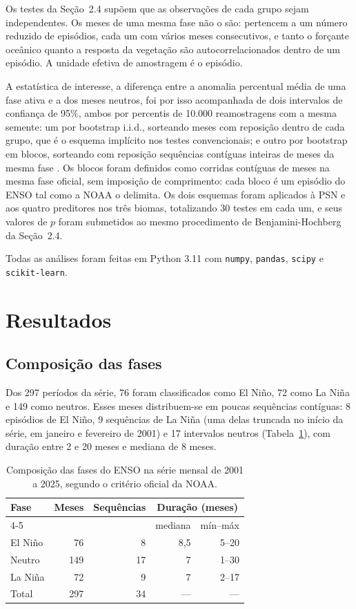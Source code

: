 \documentclass[a4paper,fleqn]{cas-sc}
\begin{document}
Os testes da Seção~2.4 supõem que as observações de cada grupo sejam independentes. Os meses de uma mesma fase não o são: pertencem a um número reduzido de episódios, cada um com vários meses consecutivos, e tanto o forçante oceânico quanto a resposta da vegetação são autocorrelacionados dentro de um episódio. A unidade efetiva de amostragem é o episódio.

A estatística de interesse, a diferença entre a anomalia percentual média de uma fase ativa e a dos meses neutros, foi por isso acompanhada de dois intervalos de confiança de 95\%, ambos por percentis de 10.000 reamostragens com a mesma semente: um por bootstrap i.i.d., sorteando meses com reposição dentro de cada grupo, que é o esquema implícito nos testes convencionais; e outro por bootstrap em blocos, sorteando com reposição sequências contíguas inteiras de meses da mesma fase \citep{kunsch1989, politis1994}. Os blocos foram definidos como corridas contíguas de meses na mesma fase oficial, sem imposição de comprimento: cada bloco é um episódio do ENSO tal como a NOAA o delimita. Os dois esquemas foram aplicados à PSN e aos quatro preditores nos três biomas, totalizando 30 testes em cada um, e seus valores de $p$ foram submetidos ao mesmo procedimento de Benjamini-Hochberg da Seção~2.4.

Todas as análises foram feitas em Python 3.11 com \texttt{numpy}, \texttt{pandas}, \texttt{scipy} e \texttt{scikit-learn}.

\section{Resultados}

\subsection{Composição das fases}

Dos 297 períodos da série, 76 foram classificados como El Niño, 72 como La Niña e 149 como neutros. Esses meses distribuem-se em poucas sequências contíguas: 8 episódios de El Niño, 9 sequências de La Niña (uma delas truncada no início da série, em janeiro e fevereiro de 2001) e 17 intervalos neutros (Tabela~\ref{tab:fases}), com duração entre 2 e 20 meses e mediana de 8 meses.

\begin{table}[width=\linewidth,cols=5,pos=!ht]
\caption{Composição das fases do ENSO na série mensal de 2001 a 2025, segundo o critério oficial da NOAA.}
\label{tab:fases}
\begin{tabular*}{\tblwidth}{@{}lrrrr@{}}
\toprule
Fase & Meses & Sequências & \multicolumn{2}{c}{Duração (meses)} \\
\cmidrule(l){4-5}
 & & & mediana & mín--máx \\
\midrule
El Niño & 76  & 8  & 8,5 & 5--20 \\
Neutro  & 149 & 17 & 7   & 1--30 \\
La Niña & 72  & 9  & 7   & 2--17 \\
\midrule
Total   & 297 & 34 & --- & --- \\
\bottomrule
\end{tabular*}
\end{table}
\end{document}
